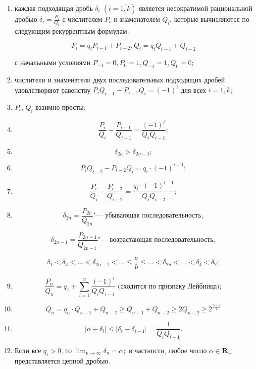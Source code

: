 \documentclass[bachelor, och, labwork]{shiza}
\begin{document}
        \begin{enumerate}
            \item каждая подходящая дробь $\delta_i$ $(i = \overline{1, k})$
            является несократимой рациональной дробью $\delta_i =
            \frac{P_i}{Q_i}$ с числителем $P_i$ и знаменателем $Q_i$, которые
            вычисляются по следующим рекуррентным формулам:

            $$P_i = q_i P_{i-1} + P_{i-2}, Q_i = q_i Q_{i-1} + Q_{i-2}$$

            с начальными условиями $P_{-1} = 0, P_{0} = 1, Q_{-1} = 1, Q_{0} =
            0$;

            \item числители и знаменатели двух последовательных подходящих
            дробей удовлетворяют равенству $P_i Q_{i-1} - P_{i-1} Q_i = (-1)^i$
            для всех $i = \overline{1, k}$;

            \item $P_i$, $Q_i$ взаимно просты;
            \item $$\frac{P_i}{Q_i} - \frac{P_{i-1}}{Q_{i-1}} = \frac{(-1)^i}{Q_i Q_{i-1}};$$
            \item $$\delta_{2n} > \delta_{2n-1};$$
            \item $$P_i Q_{i-2} - P_{i-2} Q_i = q_i \cdot (-1)^{i-1};$$
            \item $$\frac{P_i}{Q_i} - \frac{P_{i-2}}{Q_{i-2}} = \frac{q_i \cdot (-1)^{i-1}}{Q_i Q_{i-2}};$$
            \item $$\delta_{2n} = \frac{P_{2n}}{Q_{2n}} \text{"--- убывающая последовательность},$$
            
            $$\delta_{2n-1} = \frac{P_{2n-1}}{Q_{2n-1}} \text{"--- возрастающая последовательность},$$

            $$\delta_1 < \delta_3 < \dots < \delta_{2n - 1} < \dots \leq \frac{a}{b} \leq \dots < \delta_{2n} < \dots < \delta_4 < \delta_2;$$

            \item $$\frac{P_n}{Q_n} = q_1 + \sum_{i=1}^{n} \frac{(-1)^i}{Q_i Q_{i-1}} \text{ (сходится по признаку Лейбница)};$$
            \item $$Q_n = q_n \cdot Q_{n-1} + Q_{n-2} \geq Q_{n-1} + Q_{n-2} \geq 2 Q_{n-2} \geq 2^{\frac{n - 2}{2}}$$
            \item $$|\alpha - \delta_i| \leq |\delta_i - \delta_{i - 1}| = \frac{1}{Q_i Q_{i-1}}.$$
            \item Если все $q_i > 0$, то $\lim_{n \to \infty} \delta_n =
            \alpha;$ в частности, любое число $\alpha \in \mathbf{R}_+$
            представляется цепной дробью.

        \end{enumerate}
\end{document}
